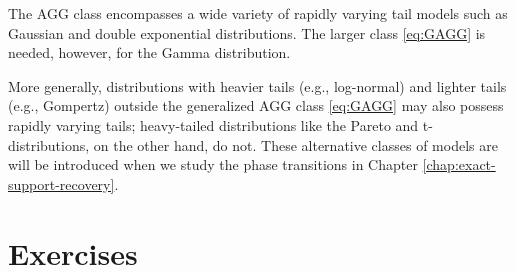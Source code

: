 The \ac{AGG} class encompasses a wide variety of rapidly varying tail models such as Gaussian and double exponential distributions. The larger class \eqref{eq:GAGG} is needed, however, for the Gamma distribution.

More generally, distributions with heavier tails (e.g., log-normal) and lighter tails (e.g., Gompertz) outside the generalized AGG class \eqref{eq:GAGG} may also possess rapidly varying tails;
heavy-tailed distributions like the Pareto and t-distributions, on the other hand, do not.
These alternative classes of models are will be introduced when we study the phase transitions in Chapter \ref{chap:exact-support-recovery}. 


\section{Exercises}


